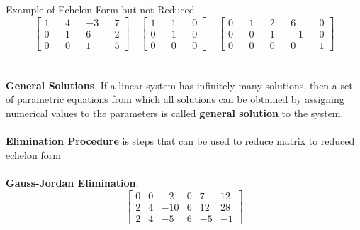 \documentclass[a4paper, 12pt]{article}
\begin{document}
Example of Echelon Form but not Reduced
$$
\begin{bmatrix}
1 && 4 && -3 && 7 \\
0 && 1 && 6 && 2 \\
0 && 0 && 1 && 5
\end{bmatrix}
\quad
\begin{bmatrix}
1 && 1 && 0 \\
0 && 1 && 0 \\
0 && 0 && 0
\end{bmatrix}
\quad
\begin{bmatrix}
0 && 1 && 2 && 6 && 0 \\
0 && 0 && 1 && -1 && 0 \\
0 && 0 && 0 && 0 && 1
\end{bmatrix}
$$
\\
\\
\textbf{General Solutions}. If a linear system has infinitely many solutions,
then a set of parametric equations from which all solutions can be obtained
by assigning numerical values to the parameters is called 
\textbf{general solution} to the system.
\\
\\
\textbf{Elimination Procedure} is steps that can be used to reduce matrix to 
reduced echelon form
\\
\\
\textbf{Gauss-Jordan Elimination}.
\[ \left[ {\begin{array}{cccccc}
0 & 0 & -2  & 0 & 7 & 12 \\
2 & 4 & -10 & 6 & 12 & 28 \\
2 & 4 & -5 & 6 & -5 & -1
\end{array}} \right] \]
\end{document}
